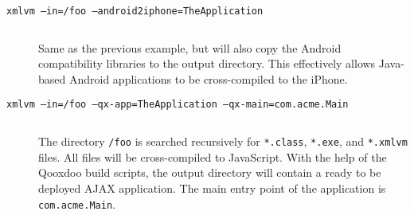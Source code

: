 \documentclass[12pt]{article}
\begin{document}
\begin{description}
\item[\texttt{xmlvm --in=/foo --android2iphone=TheApplication}] $ $

  Same as the previous example, but will also copy the Android
  compatibility libraries to the output directory. This effectively
  allows Java-based Android applications to be cross-compiled to the
  iPhone.

\item[\texttt{xmlvm --in=/foo --qx-app=TheApplication
    --qx-main=com.acme.Main}] $ $

  The directory \texttt{/foo} is searched recursively for
  \texttt{*.class}, \texttt{*.exe}, and \texttt{*.xmlvm} files. All
  files will be cross-compiled to JavaScript. With the help of the
  Qooxdoo build scripts, the output directory will contain a ready to
  be deployed AJAX application. The main entry point of the
  application is \texttt{com.acme.Main}.

\end{description}


\end{document}
